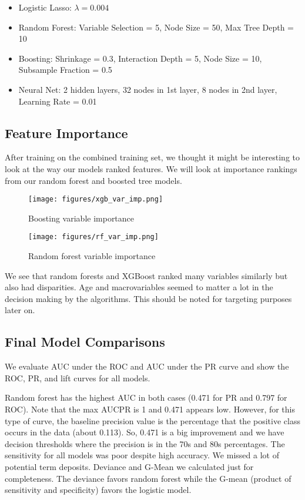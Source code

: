 \documentclass[12pt]{article}
\begin{document}
\begin{itemize}
    \item Logistic Lasso: $\lambda = 0.004$
    \item Random Forest: Variable Selection = 5, Node Size = 50, Max Tree Depth = 10
    \item Boosting: Shrinkage = 0.3, Interaction Depth = 5, Node Size = 10, Subsample Fraction = 0.5
    \item Neural Net: 2 hidden layers, 32 nodes in 1st layer, 8 nodes in 2nd layer, Learning Rate = 0.01
\end{itemize}

\subsection*{Feature Importance}
After training on the combined training set, we thought it might be interesting to look at the way our models ranked features. We will look at importance rankings from our random forest and boosted tree models.

\clearpage \newpage
\begin{figure}[ht!]
    \centering
    \texttt{[image: figures/xgb\_var\_imp.png]}
    \caption{Boosting variable importance}
    \label{xgb_var_imp}
\end{figure}

\begin{figure}[ht!]
    \centering
    \texttt{[image: figures/rf\_var\_imp.png]}
    \caption{Random forest variable importance}
    \label{rf_var_imp}
\end{figure}

We see that random forests and XGBoost ranked many variables similarly but also had disparities. Age and macrovariables seemed to matter a lot in the decision making by the algorithms. This should be noted for targeting purposes later on.

\clearpage\newpage
\subsection*{Final Model Comparisons}
We evaluate AUC under the ROC and AUC under the PR curve and show the ROC, PR, and lift curves for all models. 

Random forest has the highest AUC in both cases (0.471 for PR and 0.797 for ROC). Note that the max AUCPR is 1 and 0.471 appears low. However, for this type of curve, the baseline precision value is the percentage that the positive class occurs in the data (about 0.113). So, 0.471 is a big improvement and we have decision thresholds where the precision is in the 70s and 80s percentages. The sensitivity for all models was poor despite high accuracy. We missed a lot of potential term deposits. Deviance and G-Mean we calculated just for completeness. The deviance favors random forest while the G-mean (product of sensitivity and specificity) favors the logistic model.
\end{document}
